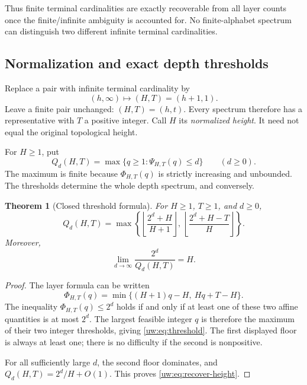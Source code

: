 \documentclass[11pt,letterpaper]{article}
\numberwithin{equation}{section}
\newtheorem{theorem}{Theorem}[section]
\theoremstyle{definition}
\theoremstyle{remark}
\theoremstyle{definition}
\newcommand{\floor}[1]{\left\lfloor #1\right\rfloor}
\begin{document}
Thus finite terminal cardinalities are exactly recoverable from all layer
counts once the finite/infinite ambiguity is accounted for. No finite-alphabet
spectrum can distinguish two different infinite terminal cardinalities.

\subsection{Normalization and exact depth thresholds}
Replace a pair with infinite terminal cardinality by
\begin{equation}\label{uw:eq:normalize}
 (h,\infty)\longmapsto(H,T)=(h+1,1).
\end{equation}
Leave a finite pair unchanged: $(H,T)=(h,t)$. Every spectrum therefore has a
representative with $T$ a positive integer. Call $H$ its \emph{normalized
height}. It need not equal the original topological height.

For $H\ge1$, put
\begin{equation}\label{uw:eq:threshold-def}
 Q_d(H,T)=\max\{q\ge1:\Psi_{H,T}(q)\le d\}\qquad(d\ge0).
\end{equation}
The maximum is finite because $\Phi_{H,T}(q)$ is strictly increasing and unbounded.
The thresholds determine the whole depth spectrum, and conversely.

\begin{theorem}[Closed threshold formula]\label{uw:thm:threshold}
For $H\ge1$, $T\ge1$, and $d\ge0$,
\begin{equation}\label{uw:eq:threshold}
 \boxed{\quad Q_d(H,T)=
 \max\left\{
 \floor{\frac{2^d+H}{H+1}},\,
 \floor{\frac{2^d+H-T}{H}}
 \right\}.\quad}
\end{equation}
Moreover,
\begin{equation}\label{uw:eq:recover-height}
 \lim_{d\to\infty}\frac{2^d}{Q_d(H,T)}=H.
\end{equation}
\end{theorem}
\begin{proof}
The layer formula can be written
\[
 \Phi_{H,T}(q)=\min\{(H+1)q-H,\ Hq+T-H\}.
\]
The inequality $\Phi_{H,T}(q)\le2^d$ holds if and only if at least one of these
two affine quantities is at most $2^d$. The largest feasible integer $q$ is
therefore the maximum of their two integer thresholds, giving
\eqref{uw:eq:threshold}. The first displayed floor is always at least one;
there is no difficulty if the second is nonpositive.

For all sufficiently large $d$, the second floor dominates, and
$Q_d(H,T)=2^d/H+O(1)$. This proves \eqref{uw:eq:recover-height}.
\end{proof}
\end{document}
